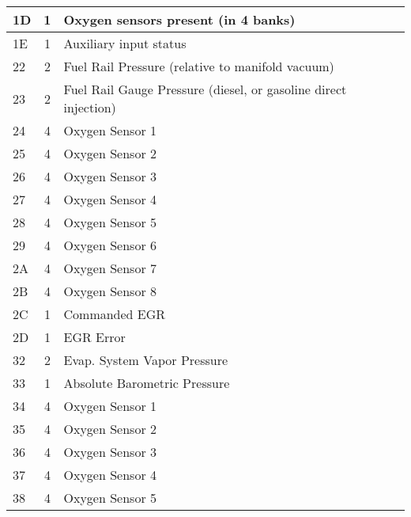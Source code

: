 \begin{longtable}{|l|c|p{10cm}|}
    1D & 1  & Oxygen sensors present (in 4 banks)                           \\ \hline
    1E & 1  & Auxiliary input status                                        \\ \hline
    22 & 2  & Fuel Rail Pressure (relative to manifold vacuum)              \\ \hline
    23 & 2  & Fuel Rail Gauge Pressure
    (diesel, or gasoline direct injection)                                  \\ \hline
    24 & 4  & Oxygen Sensor 1                                               \\ \hline
    25 & 4  & Oxygen Sensor 2                                               \\ \hline
    26 & 4  & Oxygen Sensor 3                                               \\ \hline
    27 & 4  & Oxygen Sensor 4                                               \\ \hline
    28 & 4  & Oxygen Sensor 5                                               \\ \hline
    29 & 4  & Oxygen Sensor 6                                               \\ \hline
    2A & 4  & Oxygen Sensor 7                                               \\ \hline
    2B & 4  & Oxygen Sensor 8                                               \\ \hline
    2C & 1  & Commanded EGR                                                 \\ \hline
    2D & 1  & EGR Error                                                     \\ \hline
    32 & 2  & Evap. System Vapor Pressure                                   \\ \hline
    33 & 1  & Absolute Barometric Pressure                                  \\ \hline
    34 & 4  & Oxygen Sensor 1                                               \\ \hline
    35 & 4  & Oxygen Sensor 2                                               \\ \hline
    36 & 4  & Oxygen Sensor 3                                               \\ \hline
    37 & 4  & Oxygen Sensor 4                                               \\ \hline
    38 & 4  & Oxygen Sensor 5                                               \\ \hline

\end{longtable}
